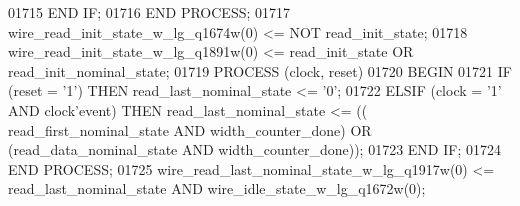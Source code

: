 \begin{DoxyCode}
{01715         \textcolor{keywordflow}{END} \textcolor{keywordflow}{IF};
01716     \textcolor{keywordflow}{END} \textcolor{keywordflow}{PROCESS};
01717     \textcolor{vhdlchar}{wire_read_init_state_w_lg_q1674w}\textcolor{vhdlchar}{(}\textcolor{vhdllogic}{}\textcolor{vhdllogic}{0}\textcolor{vhdlchar}{)} \textcolor{vhdlchar}{<=} \textcolor{keywordflow}{NOT} \textcolor{vhdlchar}{read_init_state};
01718     \textcolor{vhdlchar}{wire_read_init_state_w_lg_q1891w}\textcolor{vhdlchar}{(}\textcolor{vhdllogic}{}\textcolor{vhdllogic}{0}\textcolor{vhdlchar}{)} \textcolor{vhdlchar}{<=} \textcolor{vhdlchar}{read_init_state} \textcolor{keywordflow}{OR} \textcolor{vhdlchar}{
      read_init_nominal_state};
01719     \textcolor{keywordflow}{PROCESS} (clock, reset)
01720 \textcolor{vhdlkeyword}{    BEGIN}
01721         \textcolor{keywordflow}{IF} \textcolor{vhdlchar}{(}\textcolor{vhdlchar}{reset} \textcolor{vhdlchar}{=} \textcolor{vhdlchar}{'}\textcolor{vhdllogic}{}\textcolor{vhdllogic}{1}\textcolor{vhdlchar}{'}\textcolor{vhdlchar}{)} \textcolor{keywordflow}{THEN} \textcolor{vhdlchar}{read_last_nominal_state} \textcolor{vhdlchar}{<=} \textcolor{vhdlchar}{'}\textcolor{vhdllogic}{}\textcolor{vhdllogic}{0}\textcolor{vhdlchar}{'};
01722         \textcolor{keywordflow}{ELSIF} \textcolor{vhdlchar}{(}\textcolor{vhdlchar}{clock} \textcolor{vhdlchar}{=} \textcolor{vhdlchar}{'}\textcolor{vhdllogic}{}\textcolor{vhdllogic}{1}\textcolor{vhdlchar}{'} \textcolor{keywordflow}{AND} \textcolor{vhdlchar}{clock}\textcolor{vhdlchar}{'}\textcolor{vhdlkeyword}{event}\textcolor{vhdlchar}{)} \textcolor{keywordflow}{THEN} \textcolor{vhdlchar}{read_last_nominal_state} \textcolor{vhdlchar}{<=} \textcolor{vhdlchar}{(}\textcolor{vhdlchar}{(}\textcolor{vhdlchar}{
      read_first_nominal_state} \textcolor{keywordflow}{AND} \textcolor{vhdlchar}{width_counter_done}\textcolor{vhdlchar}{)} \textcolor{keywordflow}{OR} \textcolor{vhdlchar}{(}\textcolor{vhdlchar}{read_data_nominal_state} \textcolor{keywordflow}{AND} \textcolor{vhdlchar}{
      width_counter_done}\textcolor{vhdlchar}{)}\textcolor{vhdlchar}{)};
01723         \textcolor{keywordflow}{END} \textcolor{keywordflow}{IF};
01724     \textcolor{keywordflow}{END} \textcolor{keywordflow}{PROCESS};
01725     \textcolor{vhdlchar}{wire_read_last_nominal_state_w_lg_q1917w}\textcolor{vhdlchar}{(}\textcolor{vhdllogic}{}\textcolor{vhdllogic}{0}\textcolor{vhdlchar}{)} \textcolor{vhdlchar}{<=} \textcolor{vhdlchar}{read_last_nominal_state} \textcolor{keywordflow}{AND} \textcolor{vhdlchar}{
      wire_idle_state_w_lg_q1672w}\textcolor{vhdlchar}{(}\textcolor{vhdllogic}{}\textcolor{vhdllogic}{0}\textcolor{vhdlchar}{)};
}
\end{DoxyCode}
